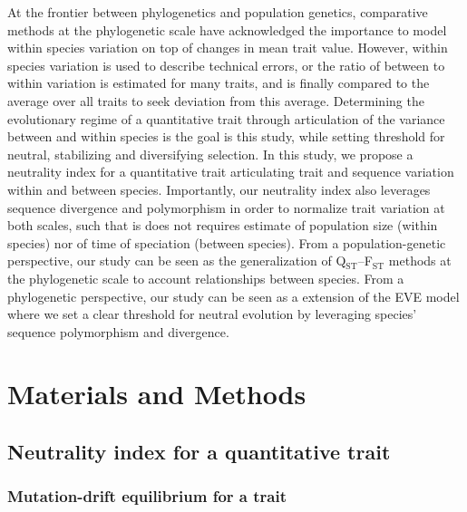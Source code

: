 \documentclass{article}
\begin{document}
At the frontier between phylogenetics and population genetics, comparative methods at the phylogenetic scale have acknowledged the importance to model within species variation on top of changes in mean trait value\cite{fay_evaluating_2008, kostikova_bridging_2016, gaboriau_multiplatform_2020}.
However, within species variation is used to describe technical errors, or the ratio of between to within variation is estimated for many traits, and is finally compared to the average over all traits to seek deviation from this average\cite{rohlfs_modeling_2014, rohlfs_phylogenetic_2015}.
Determining the evolutionary regime of a quantitative trait through articulation of the variance between and within species is the goal is this study, while setting threshold for neutral, stabilizing and diversifying selection.
In this study, we propose a neutrality index for a quantitative trait articulating trait and sequence variation within and between species.
Importantly, our neutrality index also leverages sequence divergence and polymorphism in order to normalize trait variation at both scales, such that is does not requires estimate of population size (within species) nor of time of speciation (between species).
From a population-genetic perspective, our study can be seen as the generalization of Q$_\text{ST}$--F$_\text{ST}$ methods at the phylogenetic scale to account relationships between species.
From a phylogenetic perspective, our study can be seen as a extension of the EVE model\cite{rohlfs_modeling_2014, rohlfs_phylogenetic_2015} where we set a clear threshold for neutral evolution by leveraging species' sequence polymorphism and divergence.

\section{Materials and Methods}\label{sec:materials-and-methods}
\subsection{Neutrality index for a quantitative trait}\label{subsec:neutrality-index-for-a-quantitative-trait}
\subsubsection{Mutation-drift equilibrium for a trait}
\end{document}
